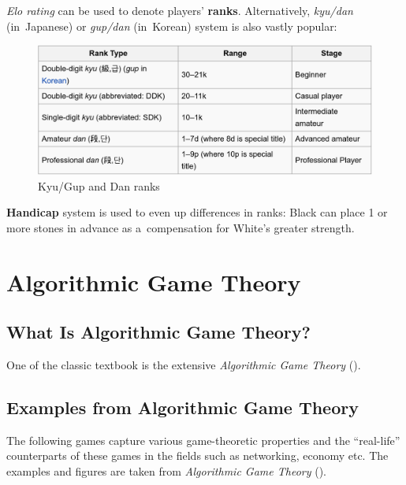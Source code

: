 \emph{Elo rating} can be used to denote players' \textbf{ranks}.
Alternatively, \emph{kyu/dan} (in~Japanese) or \emph{gup/dan} (in~Korean) system is also vastly popular:
\begin{figure}[H]
  \centering
  \includegraphics[width=.8\textwidth]{../img/Go_kyu_dan.png}
  \caption{Kyu/Gup and Dan ranks}
  \label{fig:Go-ranks}
\end{figure}

\textbf{Handicap} system is used to even up differences in ranks:
Black can place 1 or more stones in advance as a~compensation for White's greater strength.

\section{Algorithmic Game Theory}

\subsection{What Is Algorithmic Game Theory?}
One of the classic textbook is the extensive \emph{Algorithmic Game Theory} (\cite{AGT07}).
\todo

\subsection{Examples from Algorithmic Game Theory}

The following games capture various game-theoretic properties and the ``real-life'' counterparts of these games in the fields such as networking, economy etc.
The examples and figures are taken from \emph{Algorithmic Game Theory} (\cite{AGT07}).

